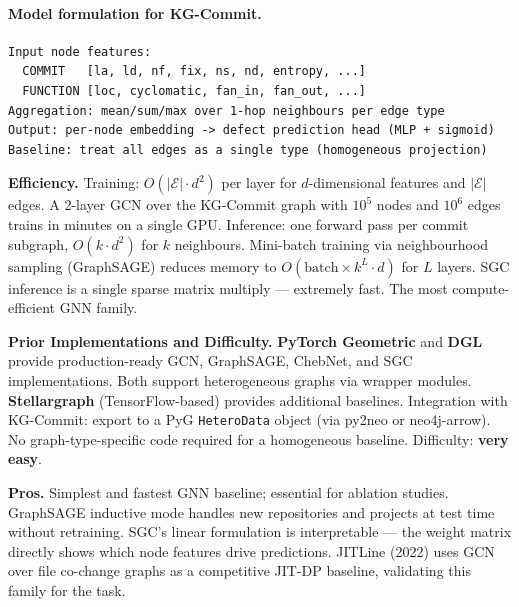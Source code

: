 \documentclass[12pt,a4paper]{article}
\begin{document}
\paragraph{Model formulation for KG-Commit.}
\begin{lstlisting}
Input node features:
  COMMIT   [la, ld, nf, fix, ns, nd, entropy, ...]
  FUNCTION [loc, cyclomatic, fan_in, fan_out, ...]
Aggregation: mean/sum/max over 1-hop neighbours per edge type
Output: per-node embedding -> defect prediction head (MLP + sigmoid)
Baseline: treat all edges as a single type (homogeneous projection)
\end{lstlisting}

\begin{effbox}
\textbf{Efficiency.}
Training: $O(|\mathcal{E}| \cdot d^2)$ per layer for $d$-dimensional features
and $|\mathcal{E}|$ edges. A 2-layer GCN over the KG-Commit graph with $10^5$
nodes and $10^6$ edges trains in minutes on a single GPU. Inference: one forward
pass per commit subgraph, $O(k \cdot d^2)$ for $k$ neighbours.
Mini-batch training via neighbourhood sampling (GraphSAGE) reduces memory to
$O(\text{batch} \times k^L \cdot d)$ for $L$ layers. SGC inference is a single
sparse matrix multiply --- extremely fast. The most compute-efficient GNN family.
\end{effbox}

\begin{implbox}
\textbf{Prior Implementations and Difficulty.}
\textbf{PyTorch Geometric} and \textbf{DGL} provide production-ready GCN,
GraphSAGE, ChebNet, and SGC implementations. Both support heterogeneous graphs
via wrapper modules. \textbf{Stellargraph} (TensorFlow-based) provides additional
baselines. Integration with KG-Commit: export to a PyG \texttt{HeteroData} object
(via py2neo or neo4j-arrow). No graph-type-specific code required for a
homogeneous baseline. Difficulty: \textbf{very easy}.
\end{implbox}

\begin{prosbox}
\textbf{Pros.}
Simplest and fastest GNN baseline; essential for ablation studies. GraphSAGE
inductive mode handles new repositories and projects at test time without
retraining. SGC's linear formulation is interpretable --- the weight matrix
directly shows which node features drive predictions. JITLine (2022) uses GCN
over file co-change graphs as a competitive JIT-DP baseline, validating this
family for the task.
\end{prosbox}
\end{document}
